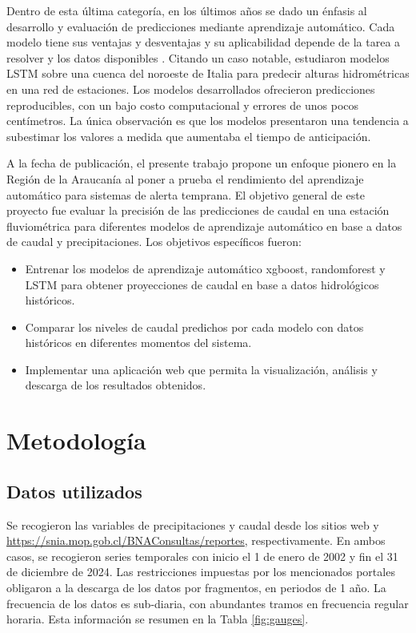 \documentclass[hess, manuscript]{copernicus}
\begin{document}
Dentro de esta última categoría, en los últimos años se dado un énfasis al desarrollo y evaluación de predicciones mediante aprendizaje automático. Cada modelo tiene sus ventajas y desventajas y su aplicabilidad depende de la tarea a resolver y los datos disponibles \citep{fischer_impact_2025}. Citando un caso notable, \citet{luppichini_machine_2024} estudiaron modelos LSTM sobre una cuenca del noroeste de Italia para predecir alturas hidrométricas en una red de estaciones. Los modelos desarrollados ofrecieron predicciones reproducibles, con un bajo costo computacional y errores de unos pocos centímetros. La única observación es que los modelos presentaron una tendencia a subestimar los valores a medida que aumentaba el tiempo de anticipación.

A la fecha de publicación, el presente trabajo propone un enfoque pionero en la Región de la Araucanía al poner a prueba el rendimiento del aprendizaje automático para sistemas de alerta temprana. El objetivo general de este proyecto fue evaluar la precisión de las predicciones de caudal en una estación fluviométrica para diferentes modelos de aprendizaje automático en base a datos de caudal y precipitaciones. Los objetivos específicos fueron:
\begin{itemize}
  \item Entrenar los modelos de aprendizaje automático xgboost, randomforest y LSTM para obtener proyecciones de caudal en base a datos hidrológicos históricos.
  \item Comparar los niveles de caudal predichos por cada modelo con datos históricos en diferentes momentos del sistema.
  \item Implementar una aplicación web que permita la visualización, análisis y descarga de los resultados obtenidos.
\end{itemize}

\section{Metodología}
\label{sec:Metodologia}

\subsection{Datos utilizados}

Se recogieron las variables de precipitaciones y caudal desde los sitios web \url{} y \url{https://snia.mop.gob.cl/BNAConsultas/reportes}, respectivamente. En ambos casos, se recogieron series temporales con inicio el 1 de enero de 2002 y fin el 31 de diciembre de 2024. Las restricciones impuestas por los mencionados portales obligaron a la descarga de los datos por fragmentos, en periodos de 1 año. La frecuencia de los datos es sub-diaria, con abundantes tramos en frecuencia regular horaria. Esta información se resumen en la Tabla \ref{fig:gauges}.
\end{document}

